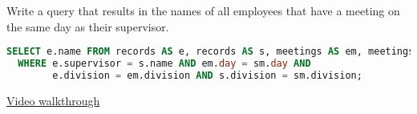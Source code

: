 \question Write a query that results in the names of all employees that have a
meeting on the same day as their supervisor.
\begin{solution}[0in]
\begin{lstlisting}[language=SQL]
SELECT e.name FROM records AS e, records AS s, meetings AS em, meetings AS sm
  WHERE e.supervisor = s.name AND em.day = sm.day AND
        e.division = em.division AND s.division = sm.division;
\end{lstlisting}
\href{https://youtu.be/BIV5O1U9Zdw?t=17m24s}{Video walkthrough}
\end{solution}
